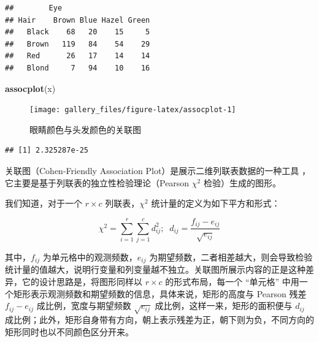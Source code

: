 \documentclass[
  b5paper,
  UTF8,twoside]{book}
\newenvironment{Shaded}{\begin{snugshade}}{\end{snugshade}}
\newcommand{\CommentTok}[1]{\textcolor[rgb]{0.56,0.35,0.01}{\textit{#1}}}
\newcommand{\FunctionTok}[1]{\textcolor[rgb]{0.13,0.29,0.53}{\textbf{#1}}}
\newcommand{\NormalTok}[1]{#1}
\newcommand{\SpecialCharTok}[1]{\textcolor[rgb]{0.81,0.36,0.00}{\textbf{#1}}}
\begin{document}
\begin{verbatim}
##        Eye
## Hair    Brown Blue Hazel Green
##   Black    68   20    15     5
##   Brown   119   84    54    29
##   Red      26   17    14    14
##   Blond     7   94    10    16
\end{verbatim}

\begin{Shaded}
\begin{Highlighting}[]
\FunctionTok{assocplot}\NormalTok{(x)}
\end{Highlighting}
\end{Shaded}

\begin{figure}

{\centering \texttt{[image: gallery\_files/figure-latex/assocplot-1]} 

}

\caption[眼睛颜色与头发颜色的关联图]{眼睛颜色与头发颜色的关联图}\label{fig:assocplot}
\end{figure}

\begin{Shaded}
\end{Shaded}

\begin{verbatim}
## [1] 2.325287e-25
\end{verbatim}

关联图（Cohen-Friendly Association
Plot）是展示二维列联表数据的一种工具 \citep{Cohen80, Friendly92}，它主要是基于列联表的独立性检验理论（Pearson
\(\chi^{2}\) 检验）生成的图形。

我们知道，对于一个 \(r\times c\) 列联表，\(\chi^{2}\) 统计量的定义为如下平方和形式：

\begin{equation} 
\chi^{2}=\sum_{i=1}^{r}\sum_{j=1}^{c}d_{ij}^{2};\;\; d_{ij}=\frac{f_{ij}-e_{ij}}{\sqrt{e_{ij}}}
\label{eq:cap}
\end{equation}

其中，\(f_{ij}\) 为单元格中的观测频数，\(e_{ij}\) 为期望频数，二者相差越大，则会导致检验统计量的值越大，说明行变量和列变量越不独立。关联图所展示内容的正是这种差异，它的设计思路是，将图形同样以 \(r\times c\) 的形式布局，每一个 ``单元格'' 中用一个矩形表示观测频数和期望频数的信息，具体来说，矩形的高度与 Pearson 残差 \(f_{ij}-e_{ij}\) 成比例，宽度与期望频数 \(\sqrt{e_{ij}}\) 成比例，这样一来，矩形的面积便与 \(d_{ij}\) 成比例；此外，矩形自身带有方向，朝上表示残差为正，朝下则为负，不同方向的矩形同时也以不同颜色区分开来。
\end{document}
